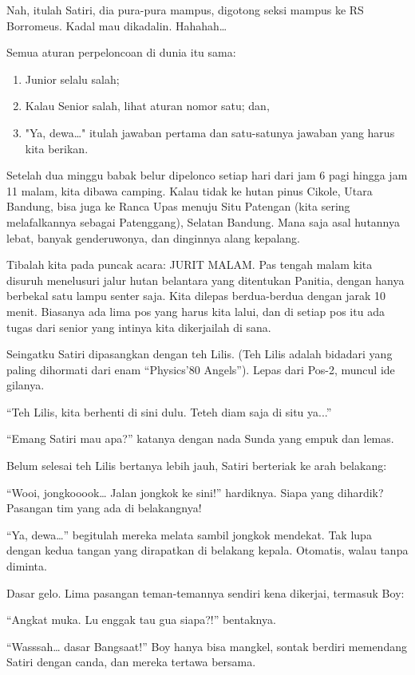 Nah, itulah Satiri, dia pura-pura mampus, digotong seksi mampus ke RS Borromeus. Kadal mau dikadalin. Hahahah…

Semua aturan perpeloncoan di dunia itu sama:

\begin{enumerate}
\item Junior selalu salah;
\item Kalau Senior salah, lihat aturan nomor satu; dan,
\item "Ya, dewa…" itulah jawaban pertama dan satu-satunya jawaban yang harus kita berikan.
\end{enumerate}

Setelah dua minggu babak belur dipelonco setiap hari dari jam 6 pagi hingga jam 11 malam, kita dibawa camping. Kalau tidak ke hutan pinus Cikole, Utara Bandung, bisa juga ke Ranca Upas menuju Situ Patengan (kita sering melafalkannya sebagai Patenggang), Selatan Bandung. Mana saja asal hutannya lebat, banyak genderuwonya, dan dinginnya alang kepalang.

Tibalah kita pada puncak acara: JURIT MALAM. Pas tengah malam kita disuruh menelusuri jalur hutan belantara yang ditentukan Panitia, dengan hanya berbekal satu lampu senter saja. Kita dilepas berdua-berdua dengan jarak 10 menit. Biasanya ada lima pos yang harus kita lalui, dan di setiap pos itu ada tugas dari senior yang intinya kita dikerjailah di sana.

Seingatku Satiri dipasangkan dengan teh Lilis. (Teh Lilis adalah bidadari yang paling dihormati dari enam “Physics’80 Angels”). Lepas dari Pos-2, muncul ide gilanya.

“Teh Lilis, kita berhenti di sini dulu. Teteh diam saja di situ ya...”

“Emang Satiri mau apa?” katanya dengan nada Sunda yang empuk dan lemas.

Belum selesai teh Lilis bertanya lebih jauh, Satiri berteriak ke arah belakang:

“Wooi, jongkooook… Jalan jongkok ke sini!” hardiknya. Siapa yang dihardik? Pasangan tim yang ada di belakangnya!

“Ya, dewa…” begitulah mereka melata sambil jongkok mendekat. Tak lupa dengan kedua tangan yang dirapatkan di belakang kepala. Otomatis, walau tanpa diminta.

Dasar gelo. Lima pasangan teman-temannya sendiri kena dikerjai, termasuk Boy:

“Angkat muka. Lu enggak tau gua siapa?!” bentaknya.

“Wasssah… dasar Bangsaat!” Boy hanya bisa mangkel, sontak berdiri memendang Satiri dengan canda, dan mereka tertawa bersama.

